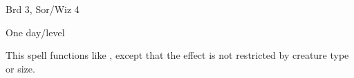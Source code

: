 
\begin{description*}
\item[Level:] Brd 3, Sor/Wiz 4
\item[Duration:] One day/level
\end{description*}

This spell functions like , except that the effect is not
restricted by creature type or size.